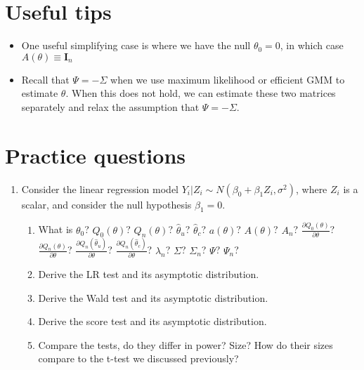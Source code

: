\documentclass[12pt,english]{article}
\begin{document}
\section{Useful tips}

\begin{itemize}
	\item One useful simplifying case is where we have the null $\theta_{0} = 0$, in which case $A(\theta) \equiv \mathbf{I}_{n}$
	\item Recall that $\Psi = -\Sigma$ when we use maximum likelihood or efficient GMM to estimate $\theta$. When this does not hold, we can estimate these two matrices separately and relax the assumption that $\Psi = -\Sigma$.
\end{itemize}

\section{Practice questions}

\begin{enumerate}
	\item Consider the linear regression model $Y_{i} | Z_{i} \sim N(\beta_{0} + \beta_{1} Z_{i}, \sigma^{2})$, where $Z_{i}$ is a scalar, and consider the null hypothesis $\beta_{1} = 0$.
	\begin{enumerate}
		\item What is $\theta_{0}$? $Q_{0}(\theta)$? $Q_{n}(\theta)$? $\hat{\theta}_{u}$? $\hat{\theta}_{c}$? $a(\theta)$? $A(\theta)$? $A_{n}$? $\frac{\partial Q_{0}(\theta)}{\partial \theta}$? $\frac{\partial Q_{n}(\theta)}{\partial \theta}$? $\frac{\partial Q_{n}(\hat{\theta}_{u})}{\partial \theta}$? $\frac{\partial Q_{n}(\hat{\theta}_{c})}{\partial \theta}$? $\lambda_{n}$? $\Sigma$? $\Sigma_{n}$? $\Psi$? $\Psi_{n}$?
		\item Derive the LR test and its asymptotic distribution.
		\item Derive the Wald test and its asymptotic distribution.
		\item Derive the score test and its asymptotic distribution.
		\item Compare the tests, do they differ in power? Size? How do their sizes compare to the t-test we discussed previously?
	\end{enumerate}
\end{enumerate}
\end{document}

